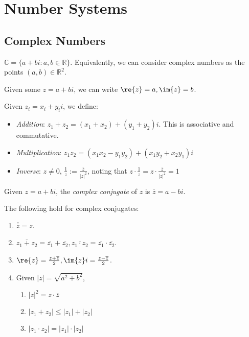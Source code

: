 \documentclass[12pt,oneside]{article}
\begin{document}
\section{Number Systems}
\subsection{Complex Numbers}
\begin{definition}
  $\mathbb{C} = \{a + bi : a, b \in \mathbb{R}\}$. Equivalently, we can consider complex numbers as the points $(a,b) \in \mathbb{R}^2$.\footnotemark

  Given some $z = a + bi$, we can write $\re{z} = a, \im{z} =b$.
\end{definition}

\begin{definition}
  Given $z_i = x_i + y_i i$, we define:
  \begin{itemize}
    \item \emph{Addition}: $z_1 + z_2 = (x_1+ x_2) + (y_1 + y_2)i$. This is associative and commutative.
    \item \emph{Multiplication}: $z_1 z_2 = (x_1x_2-y_1y_2)+(x_1y_2+x_2y_1)i$
    \item \emph{Inverse}: $z \neq 0$, $\frac{1}{z} := \frac{\overline{z}}{|z|^2}$, noting that $z\cdot\frac{1}{z} = z\cdot\frac{\overline{z}}{|z|^2} = 1$
  \end{itemize}
\end{definition}

\begin{definition}
  Given $z = a + bi$, the \emph{complex conjugate} of $z$ is $\overline{z} = a - bi$.
\end{definition}

\begin{lemma}
  The following hold for complex conjugates:\footnotemark

  \begin{enumerate}[label=(\alph*)]
    \item $\overline{\overline{z}} = z$.
    \item $\overline{z_1 + z_2} = \overline{z_1} + \overline{z_2}, \overline{z_1 \cdot z_2} = \overline{z_1} \cdot \overline{z_2}$.
    \item $\re{z} = \frac{z+\overline{z}}{2}, \im{z}i = \frac{z-\overline{z}}{2}$.
    \item Given $|z| = \sqrt{a^2+b^2}$, 
    \begin{enumerate}[label=(\roman*)]
      \item $|z|^2 = z \cdot \overline{z}$
      \item $|z_1 + z_2|\leq |z_1| + |z_2|$
      \item $|z_1\cdot z_2| = |z_1| \cdot |z_2|$
    \end{enumerate}
  \end{enumerate}
\end{lemma}
\end{document}
